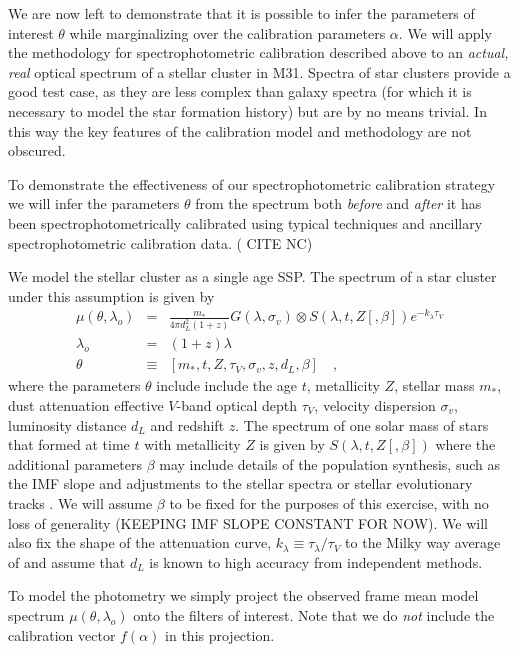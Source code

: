 \documentclass[12pt, letterpaper, preprint]{aastex}
\begin{document}
We are now left to demonstrate that it is possible to infer the
parameters of interest $\theta$ while marginalizing over the
calibration parameters $\alpha$.  We will apply the methodology for
spectrophotometric calibration described above to an \emph{actual,
real} optical spectrum of a stellar cluster in M31.  Spectra of star
clusters provide a good test case, as they are less complex than
galaxy spectra (for which it is necessary to model the star formation
history) but are by no means trivial. In this way the key features of
the calibration model and methodology are not obscured.  

To demonstrate the effectiveness of our spectrophotometric calibration
strategy we will infer the parameters $\theta$ from the spectrum both
\emph{before} and \emph{after} it has been spectrophotometrically
calibrated using typical techniques and ancillary spectrophotometric
calibration data. ( CITE NC)


We model the stellar cluster as a single age SSP. The spectrum of a
star cluster under this assumption is given by
\begin{eqnarray}\label{eq:MeanModel} 
\mu(\theta, \lambda_o) & = &
\frac{m_*}{4\pi d_L^2(1+z)} G(\lambda,\sigma_v) \otimes 
S(\lambda, t, Z [, \beta]) e^ {-k_\lambda\tau_V} 
\\ 
\lambda_o & = & (1+z)\lambda \\
\theta & \equiv & [m_*, t, Z, \tau_V, \sigma_v, z, d_L, \beta]
\quad ,
\end{eqnarray} where the parameters $\theta$ include include the age
$t$, metallicity $Z$, stellar mass $m_*$, dust attenuation effective
$V$-band optical depth $\tau_V$, velocity dispersion $\sigma_v$,
luminosity distance $d_L$ and redshift $z$.  The spectrum of one solar
mass of stars that formed at time $t$ with metallicity $Z$ is given by
$S(\lambda, t, Z [, \beta])$ where the additional parameters $\beta$
may include details of the population synthesis, such as the IMF slope
and adjustments to the stellar spectra or stellar evolutionary tracks
\citep[e.g.][]{FSPS}. We will assume $\beta$ to be fixed for the
purposes of this exercise, with no loss of generality (KEEPING IMF
SLOPE CONSTANT FOR NOW).  We will also fix the shape of the
attenuation curve, $k_\lambda \equiv \tau_\lambda/\tau_V$ to the Milky
way average of \citet{CCM89} and assume that $d_L$ is known to high
accuracy from independent methods.

To model the photometry we simply project the observed frame mean
model spectrum $\mu(\theta, \lambda_o)$ onto the filters of
interest.  Note that we do \emph{not} include the calibration vector
$f(\alpha)$ in this projection.
 
\end{document}
